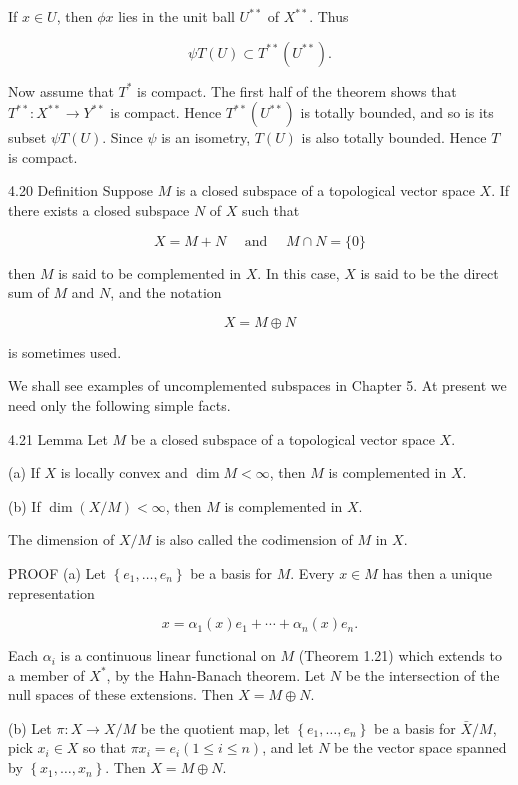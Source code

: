 \documentclass[10pt]{article}
\begin{document}
If $x \in U$, then $\phi x$ lies in the unit ball $U^{* *}$ of $X^{* *}$. Thus

$$
\psi T(U) \subset T^{* *}\left(U^{* *}\right) .
$$

Now assume that $T^{*}$ is compact. The first half of the theorem shows that $T^{* *}: X^{* *} \rightarrow Y^{* *}$ is compact. Hence $T^{* *}\left(U^{* *}\right)$ is totally bounded, and so is its subset $\psi T(U)$. Since $\psi$ is an isometry, $T(U)$ is also totally bounded. Hence $T$ is compact.

4.20 Definition Suppose $M$ is a closed subspace of a topological vector space $X$. If there exists a closed subspace $N$ of $X$ such that

$$
X=M+N \quad \text { and } \quad M \cap N=\{0\}
$$

then $M$ is said to be complemented in $X$. In this case, $X$ is said to be the direct sum of $M$ and $N$, and the notation

$$
X=M \oplus N
$$

is sometimes used.

We shall see examples of uncomplemented subspaces in Chapter 5. At present we need only the following simple facts.

4.21 Lemma Let $M$ be a closed subspace of a topological vector space $X$.

(a) If $X$ is locally convex and $\operatorname{dim} M<\infty$, then $M$ is complemented in $X$.

(b) If $\operatorname{dim}(X / M)<\infty$, then $M$ is complemented in $X$.

The dimension of $X / M$ is also called the codimension of $M$ in $X$.

PROOF (a) Let $\left\{e_{1}, \ldots, e_{n}\right\}$ be a basis for $M$. Every $x \in M$ has then a unique representation

$$
x=\alpha_{1}(x) e_{1}+\cdots+\alpha_{n}(x) e_{n} .
$$

Each $\alpha_{i}$ is a continuous linear functional on $M$ (Theorem 1.21) which extends to a member of $X^{*}$, by the Hahn-Banach theorem. Let $N$ be the intersection of the null spaces of these extensions. Then $X=M \oplus N$.

(b) Let $\pi: X \rightarrow X / M$ be the quotient map, let $\left\{e_{1}, \ldots, e_{n}\right\}$ be a basis for $\bar{X} / M$, pick $x_{i} \in X$ so that $\pi x_{i}=e_{i}(1 \leq i \leq n)$, and let $N$ be the vector space spanned by $\left\{x_{1}, \ldots, x_{n}\right\}$. Then $X=M \oplus N$.
\end{document}

